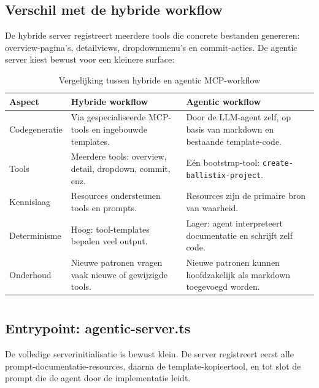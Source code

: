 \subsection{Verschil met de hybride workflow}

De hybride server registreert meerdere tools die concrete bestanden genereren: overview-pagina's, detailviews, dropdownmenu's en commit-acties. De agentic server kiest bewust voor een kleinere surface:

\begin{table}[htbp]
  \centering
  \caption{Vergelijking tussen hybride en agentic MCP-workflow}
  \label{tab:poc-agentic-vs-hybrid}
  \small
  \begin{tabularx}{\textwidth}{|l|X|X|}
    \hline
    \textbf{Aspect} & \textbf{Hybride workflow} & \textbf{Agentic workflow} \\
    \hline
    Codegeneratie &
    Via gespecialiseerde MCP-tools en ingebouwde templates. &
    Door de LLM-agent zelf, op basis van markdown en bestaande template-code. \\
    \hline
    Tools &
    Meerdere tools: overview, detail, dropdown, commit, enz. &
    Eén bootstrap-tool: \texttt{create-ballistix-project}. \\
    \hline
    Kennislaag &
    Resources ondersteunen tools en prompts. &
    Resources zijn de primaire bron van waarheid. \\
    \hline
    Determinisme &
    Hoog: tool-templates bepalen veel output. &
    Lager: agent interpreteert documentatie en schrijft zelf code. \\
    \hline
    Onderhoud &
    Nieuwe patronen vragen vaak nieuwe of gewijzigde tools. &
    Nieuwe patronen kunnen hoofdzakelijk als markdown toegevoegd worden. \\
    \hline
  \end{tabularx}
\end{table}

\section{}
\label{sec:poc-agentic-server}

\subsection{Entrypoint: agentic-server.ts}

De volledige serverinitialisatie is bewust klein. De server registreert eerst alle prompt-documentatie-resources, daarna de template-kopieertool, en tot slot de prompt die de agent door de implementatie leidt.

